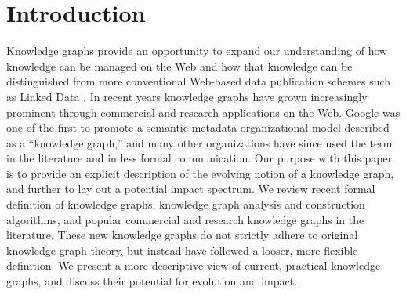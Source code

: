 \section{Introduction}


Knowledge graphs provide an opportunity to expand our understanding of how knowledge can be managed on the Web and how that knowledge can be distinguished from more conventional Web-based data publication schemes such as Linked Data \cite{bizer2009linked}.
In recent years knowledge graphs have grown increasingly prominent through commercial and research applications on the Web.
Google was one of the first to promote a semantic metadata organizational model described as a ``knowledge graph,'' \cite{singhal2012introducing} and many other organizations have since used the term in the literature and in less formal communication.
Our purpose with this paper is to provide an explicit description of the evolving notion of a knowledge graph, and further to lay out a potential impact spectrum.  
We review recent formal definition of knowledge graphs, knowledge graph analysis and construction algorithms, and popular commercial and research knowledge graphs in the literature.
These new knowledge graphs do not strictly adhere to original knowledge graph theory, but instead have followed a looser, more flexible definition.
We present a more descriptive view of current, practical knowledge graphs, and discuss their potential for evolution and impact.